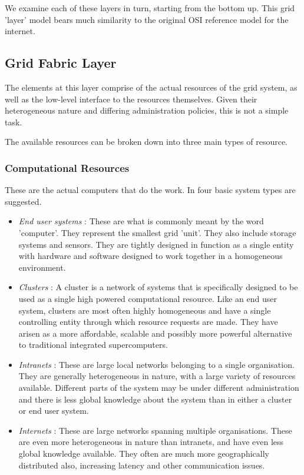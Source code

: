 We examine each of these layers in turn, starting from the bottom up. This grid
'layer' model bears much similarity to the original OSI reference
model\cite{grid-osi-www} for the internet.

\subsection{Grid Fabric Layer}

The elements at this layer comprise of the actual resources of the grid system,
as well as the low-level interface to the resources themselves.  Given their
heterogeneous nature and differing administration policies, this is not a
simple task.

The available resources can be broken down into three main types of resource.

\subsubsection{Computational Resources}

These are the actual computers that do the work. In
\cite{grid-foster99-blueprint} four basic system types are suggested.

\begin{itemize}

  \item{\emph{End user systems}} :  These are what is commonly meant by the
    word 'computer'.  They represent the smallest grid 'unit'.  They also
    include storage systems and sensors.  They are tightly designed in function
    as a single entity with hardware and software designed to work together in
    a homogeneous environment.

  \item{\emph{Clusters}} : A cluster is a network of systems that is
    specifically designed to be used as a single high powered computational
    resource.  Like an end user system, clusters are most often highly homogeneous
    and have a single controlling entity through which resource requests are
    made.  They have arisen as a more affordable, scalable and possibly more
    powerful alternative to traditional integrated supercomputers.

  \item{\emph{Intranets}} : These are large local networks belonging to a single
    organisation.  They are generally heterogeneous in nature, with a large
    variety of resources available.  Different parts of the system may be under
    different administration and there is less global knowledge about the
    system than in either a cluster or end user system.

  \item{\emph{Internets}} : These are large networks spanning multiple
    organisations.  These are even more heterogeneous in nature than intranets,
    and have even less global knowledge available.  They often are much more
    geographically distributed also, increasing latency and other communication
    issues.

\end{itemize}

